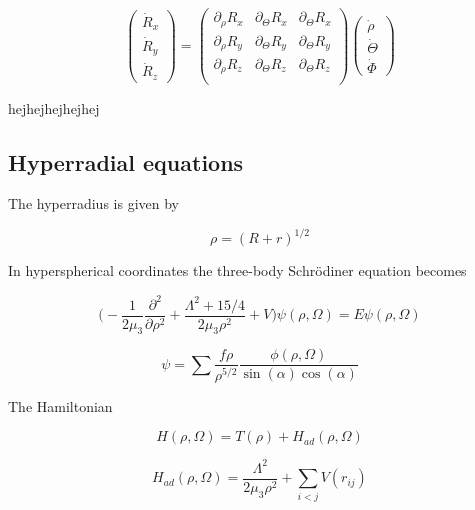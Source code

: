 \documentclass{article}
\begin{document}
\begin{equation}
\begin{pmatrix}
       \dot{R}_x \\
       \dot{R}_y \\
       \dot{R}_z
     \end{pmatrix} = \begin{pmatrix}
       \partial_{\rho} R_x & \partial_{\Theta} R_x & \partial_{\Theta} R_x\\
       \partial_{\rho} R_y & \partial_{\Theta} R_y & \partial_{\Theta} R_y\\
       \partial_{\rho} R_z & \partial_{\Theta} R_z & \partial_{\Theta} R_z\\
     \end{pmatrix}
     \begin{pmatrix}
     \dot{\rho}\\
     \dot{\Theta}\\
     \dot{\Phi}
\end{pmatrix}
\end{equation}

hejhejhejhejhej

\subsection{Hyperradial equations}

The hyperradius is given by

\begin{equation}
\rho = (R + r)^{1/2}
\end{equation}

In hyperspherical coordinates the three-body Schr{\"o}diner equation becomes

\begin{equation}
\Bigg(-\frac{1}{2 \mu_{3}}\frac{\partial^2}{ \partial \rho^2} + \frac{\Lambda^2 + 15/4}{2 \mu_{3} \rho^2} + V \Bigg)\psi(\rho,\Omega) = E\psi(\rho,\Omega)
\end{equation}

\begin{equation}
\psi = \sum \frac{f{\rho}}{\rho^{5/2}} \frac{\phi{(\rho,\Omega)}}{\sin(\alpha) \cos(\alpha)}
\end{equation}

The Hamiltonian

\begin{equation}
H(\rho,\Omega) = T(\rho) + H_{ad}(\rho,\Omega)
\end{equation}

\begin{equation}
H_{ad}(\rho,\Omega) = \frac{\Lambda^2}{2 \mu_{3} \rho^2} + \sum_{i<j} V(r_{ij})
\end{equation}
\end{document}
